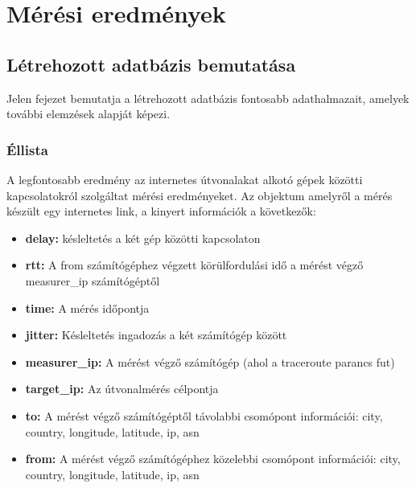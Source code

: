 \chapter{Mérési eredmények}




\section{Létrehozott adatbázis bemutatása}
Jelen fejezet bemutatja a létrehozott adatbázis fontosabb adathalmazait, amelyek további elemzések alapját képezi.

\subsection*{Éllista}
A legfontosabb eredmény az internetes útvonalakat alkotó gépek közötti kapcsolatokról szolgáltat mérési eredményeket. Az objektum amelyről a mérés készült egy internetes link, a kinyert információk a következők:

\begin{itemize}
\item \textbf{delay:} késleltetés a két gép közötti kapcsolaton
\item \textbf{rtt:} A from számítógéphez végzett körülfordulási idő a mérést végző measurer\_ip számítógéptől
\item \textbf{time:} A mérés időpontja
\item \textbf{jitter:} Késleltetés ingadozás a két számítógép között
\item \textbf{measurer\_ip:} A mérést végző számítógép (ahol a traceroute parancs fut)
\item \textbf{target\_ip:} Az útvonalmérés célpontja
\item \textbf{to:} A mérést végző számítógéptől távolabbi csomópont információi: city, country, longitude, latitude, ip, asn
\item \textbf{from:} A mérést végző számítógéphez közelebbi csomópont információi: city, country, longitude, latitude, ip, asn
\end{itemize}

